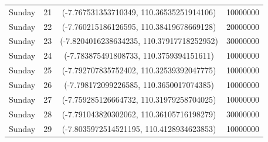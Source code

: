 \documentclass{skripsimathugm}
\begin{document}
\begin{table}[H]
\begin{tabular}{|c|c|c|c|}
Sunday & 21 & (-7.767531353710349, 110.36535251914106) & 10000000 \\
Sunday & 22 & (-7.760215186126595, 110.38419678669128) & 20000000 \\
Sunday & 23 & (-7.8204016238634235, 110.37917718252952) & 30000000 \\
Sunday & 24 & (-7.783875491808733, 110.3759394151611) & 10000000 \\
Sunday & 25 & (-7.792707835752402, 110.32539392047775) & 10000000 \\
Sunday & 26 & (-7.798172099226585, 110.3650017074385) & 10000000 \\
Sunday & 27 & (-7.759285126664732, 110.31979258704025) & 10000000 \\
Sunday & 28 & (-7.791043820302062, 110.36105716198279) & 30000000 \\
Sunday & 29 & (-7.8035972514521195, 110.4128934623853) & 10000000 \\
\hline
\end{tabular}
\end{table}
\end{document}
